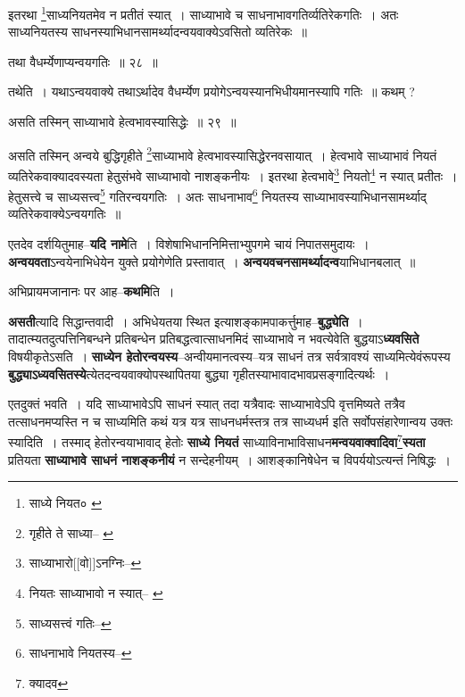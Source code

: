 \documentclass[article,12pt,a4paper]{memoir}
\begin{document}
	  \pstart इतरथा \footnote{साध्ये नियत० \cite{dp-msC}}\-साध्यनियतमेव न प्रतीतं स्यात् । साध्याभावे च साधनाभावगतिर्व्यतिरेकगतिः । अतः साध्यनियतस्य साधनस्याभिधानसामर्थ्यादन्वयवाक्येऽवसितो व्यतिरेकः ॥
	\pend
       
	  \bigskip
	  \begingroup
	

	  \pstart तथा वैधर्म्येणाप्यन्वयगतिः ॥ २८ ॥
	\pend
      
	  \endgroup
	 

	  \pstart तथेति । यथाऽन्वयवाक्ये तथाऽर्थादेव वैधर्म्येण प्रयोगेऽन्वयस्यानभिधीयमानस्यापि गतिः ॥ कथम् ?
	\pend
       
	  \bigskip
	  \begingroup
	

	  \pstart असति तस्मिन् साध्याभावे हेत्वभावस्यासिद्धेः ॥ २९ ॥
	\pend
      
	  \endgroup
	 

	  \pstart असति तस्मिन् अन्वये बुद्धिगृहीते \footnote{गृहीते ते साध्या--\cite{dp-msA} \cite{dp-edP} \cite{dp-edH}}\-साध्याभावे हेत्वभावस्यासिद्धेरनवसायात् । हेत्वभावे साध्याभावं नियतं व्यतिरेकवाक्यादवस्यता हेतुसंभवे साध्याभावो नाशङ्कनीयः । इतरथा हेत्वभावे\footnote{साध्याभारो[[वो]]ऽनग्निः--\cite{dp-msD-n}} नियतो\footnote{नियतः साध्याभावो न स्यात्--\cite{dp-msA} \cite{dp-msB} \cite{dp-msD} \cite{dp-edP} \cite{dp-edH} \cite{dp-edE} \cite{dp-edN}} न स्यात् प्रतीतः । हेतुसत्त्वे च साध्यसत्त्व\footnote{साध्यसत्त्वं गतिः--\cite{dp-msA}} गतिरन्वयगतिः । अतः साधनाभाव\footnote{साधनाभावे नियतस्य--\cite{dp-msC}} नियतस्य साध्याभावस्याभिधानसामर्थ्याद् व्यतिरेकवाक्येऽन्वयगतिः ॥
	\pend
      
	  \endgroup
	

	  \pstart एतदेव दर्शयितुमाह--\textbf{यदि नामे}ति । विशेषाभिधाननिमित्ताभ्युपगमे चायं निपातसमुदायः । \textbf{अन्वयवता}ऽन्वयेनाभिधेयेन युक्ते प्रयोगेणेति प्रस्तावात् । \textbf{अन्वयवचनसामर्थ्यादन्व}\leavevmode{}याभिधानबलात् ॥
	\pend
      

	  \pstart अभिप्रायमजानानः पर आह--\textbf{कथमि}ति ।
	\pend
      

	  \pstart \textbf{असती}त्यादि सिद्धान्तवादी । अभिधेयतया स्थित इत्याशङ्कामपाकर्त्तुमाह--\textbf{बुद्ध्येति} । तादात्म्यतदुत्पत्तिनिबन्धने प्रतिबन्धेन प्रतिबद्धत्वात्साधनमिदं साध्याभावे न भवत्येवेति बुद्धयाऽ\textbf{ध्यवसिते} विषयीकृतेऽसति । \textbf{साध्येन हेतोरन्वयस्य}--अन्वीयमानत्वस्य--यत्र साधनं तत्र सर्वत्रावश्यं साध्यमित्येवंरूपस्य \textbf{बुद्ध्याऽध्यवसितस्ये}त्येतदन्वयवाक्योपस्थापितया बुद्ध्या गृहीतस्याभावादभावप्रसङ्गादित्यर्थः ।
	\pend
      

	  \pstart एतदुक्तं भवति । यदि साध्याभावेऽपि साधनं स्यात् तदा यत्रैवादः साध्याभावेऽपि वृत्तमिष्यते तत्रैव तत्साधनमप्यस्ति न च साध्यमिति कथं यत्र यत्र साधनधर्मस्तत्र तत्र साध्यधर्म इति सर्वोपसंहारेणान्वय उक्तः स्यादिति । तस्माद् हेतोरन्वयाभावाद् हेतोः \textbf{साध्ये नियतं} साध्याविनाभाविसाधन\textbf{मन्वयवाक्वादिवा}\footnote{क्यादव}\textbf{स्यता} प्रतियता \textbf{साध्याभावे साधनं नाशङ्कनीयं} न सन्देहनीयम् । आशङ्कानिषेधेन च विपर्ययोऽत्यन्तं निषिद्धः ।
	\pend
      
\end{document}

